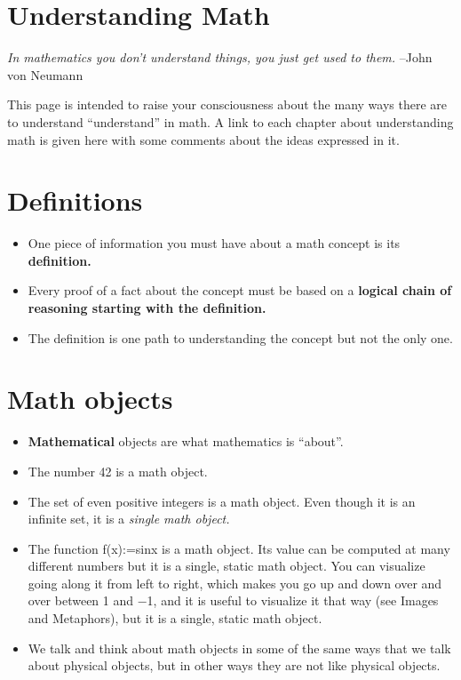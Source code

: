 \section*{Understanding Math}
    \textit{In mathematics you don’t understand things, you just get used to them.}
    –John von Neumann

    This page is intended to raise your consciousness about the many ways there are
    to understand “understand” in math. A link to each chapter about understanding
    math is given here with some comments about the ideas expressed in it.

\section*{Definitions}
    \begin{itemize}
        \item{One piece of information you must have about a math concept is its \textbf{definition.}}
        \item{Every proof of a fact about the concept must be based on a \textbf{logical chain of reasoning starting with the definition.}}
        \item{The definition is one path to understanding the concept but not the only one.}
    \end{itemize}

\section*{Math objects}
    \begin{itemize}
        \item{\textbf{Mathematical} objects are what mathematics is “about”.}
        \item{The number 42 is a math object.}
        \item{The set of even positive integers is a math object. Even though it is an infinite set, it is a \textit{single math object.}}
        \item{The function f(x):=sinx is a math object. Its value can be computed at many different numbers but it is a single, static math object. You can visualize going along it from left to right, which makes you go up and down over and over between 1 and −1, and it is useful to visualize it that way (see Images and Metaphors), but it is a single, static math object.}
        \item{We talk and think about math objects in some of the same ways that we talk about physical objects, but in other ways they are not like physical objects.}
    \end{itemize}
